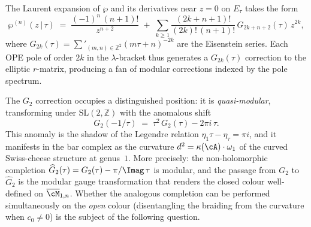 \begin{remark}
\label{rem:eisenstein-fan}
The Laurent expansion of $\wp$ and its derivatives
near $z=0$ on $E_\tau$ takes the form
\[
\wp^{(n)}(z\,|\,\tau)
\;=\;
\frac{(-1)^n\,(n+1)!}{z^{n+2}}
\;+\;
\sum_{k\ge 1}
 \frac{(2k+n+1)!}{(2k)!\,(n+1)!}\,
 G_{2k+n+2}(\tau)\,z^{2k},
\]
where $G_{2k}(\tau)=\sum'_{(m,n)\in\mathbb{Z}^2}(m\tau+n)^{-2k}$
are the Eisenstein series. Each OPE pole of order $2k$
in the $\lambda$-bracket thus generates a $G_{2k}(\tau)$
correction to the elliptic $r$-matrix, producing a fan of
modular corrections indexed by the pole spectrum.

The $G_2$ correction occupies a distinguished position:
it is \emph{quasi-modular}, transforming under
$\mathrm{SL}(2,\mathbb{Z})$ with the anomalous shift
\[
G_2(-1/\tau) \;=\; \tau^2\,G_2(\tau)-2\pi i\,\tau.
\]
This anomaly is the shadow of the Legendre relation
$\eta_1\tau-\eta_\tau=\pi i$, and it manifests in the
bar complex as the curvature $d^2=\kappa(\cA)\cdot\omega_1$
of the curved Swiss-cheese structure at genus~$1$. More
precisely: the non-holomorphic completion
$\widehat{G}_2(\tau)=G_2(\tau)-\pi/\Imag\,\tau$
is modular, and the passage from $G_2$ to $\widehat{G}_2$
is the modular gauge transformation that renders the closed
colour well-defined on $\overline{\cM}_{1,n}$. Whether
the analogous completion can be performed simultaneously
on the \emph{open} colour (disentangling the braiding
from the curvature when $c_0\ne 0$) is the subject
of the following question.
\end{remark}

